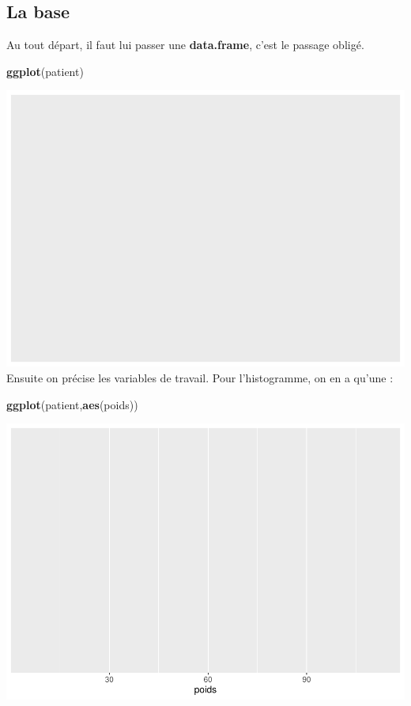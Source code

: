 \documentclass[
]{book}
\newenvironment{Shaded}{\begin{snugshade}}{\end{snugshade}}
\newcommand{\FunctionTok}[1]{\textcolor[rgb]{0.13,0.29,0.53}{\textbf{#1}}}
\newcommand{\NormalTok}[1]{#1}
\begin{document}
\hypertarget{la-base}{%
\subsection{La base}\label{la-base}}

Au tout départ, il faut lui passer une \textbf{data.frame}, c'est le passage obligé.

\begin{Shaded}
\begin{Highlighting}[]
\FunctionTok{ggplot}\NormalTok{(patient)}
\end{Highlighting}
\end{Shaded}

\includegraphics{_main_files/figure-latex/ggplot1-1.pdf}
Ensuite on précise les variables de travail. Pour l'histogramme, on en a qu'une :

\begin{Shaded}
\begin{Highlighting}[]
\FunctionTok{ggplot}\NormalTok{(patient,}\FunctionTok{aes}\NormalTok{(poids))}
\end{Highlighting}
\end{Shaded}

\includegraphics{_main_files/figure-latex/ggplot2-1.pdf}
\end{document}
